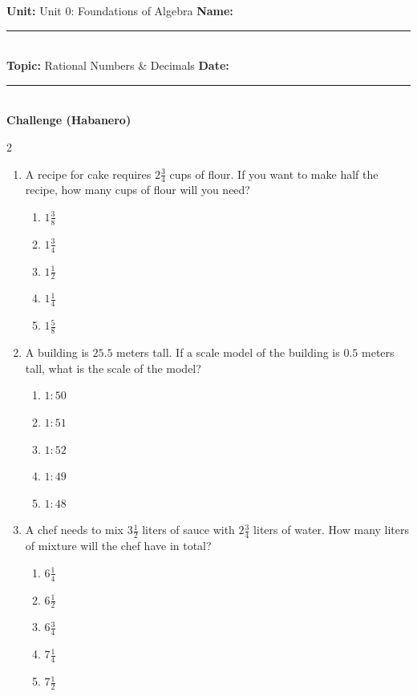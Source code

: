 \documentclass[10pt]{article}
\begin{document}
\enlargethispage{2.5cm}

\begin{tcolorbox}[colback=mainblue!5, colframe=mainblue, sharp corners, boxrule=0.5pt]
    \small \textbf{Unit:} Unit 0: Foundations of Algebra \hfill \textbf{Name:} \rule{3cm}{0.4pt} \\
    \small \textbf{Topic:} Rational Numbers & Decimals \hfill \textbf{Date:} \rule{2cm}{0.4pt} \\
    \centering \textbf{\large Challenge (Habanero)}
\end{tcolorbox}

\vspace{0.2cm}

\begin{multicols}{2}
\begin{enumerate}[label=\textbf{Q\arabic*.}, leftmargin=*, itemsep=6pt, parsep=0pt]

  \item \small A recipe for cake requires $2 \frac{3}{4}$ cups of flour. If you want to make half the recipe, how many cups of flour will you need?
  \begin{enumerate}[label=(\Alph*), leftmargin=0.6cm, nosep, itemsep=2pt]
    \item $1 \frac{3}{8}$
    \item $1 \frac{3}{4}$
    \item $1 \frac{1}{2}$
    \item $1 \frac{1}{4}$
    \item $1 \frac{5}{8}$
  \end{enumerate}

  \item \small A building is $25.5$ meters tall. If a scale model of the building is $0.5$ meters tall, what is the scale of the model?
  \begin{enumerate}[label=(\Alph*), leftmargin=0.6cm, nosep, itemsep=2pt]
    \item $1:50$
    \item $1:51$
    \item $1:52$
    \item $1:49$
    \item $1:48$
  \end{enumerate}

  \item \small A chef needs to mix $3 \frac{1}{2}$ liters of sauce with $2 \frac{3}{4}$ liters of water. How many liters of mixture will the chef have in total?
  \begin{enumerate}[label=(\Alph*), leftmargin=0.6cm, nosep, itemsep=2pt]
    \item $6 \frac{1}{4}$
    \item $6 \frac{1}{2}$
    \item $6 \frac{3}{4}$
    \item $7 \frac{1}{4}$
    \item $7 \frac{1}{2}$
  \end{enumerate}


\end{enumerate}
\end{multicols}
\end{document}
